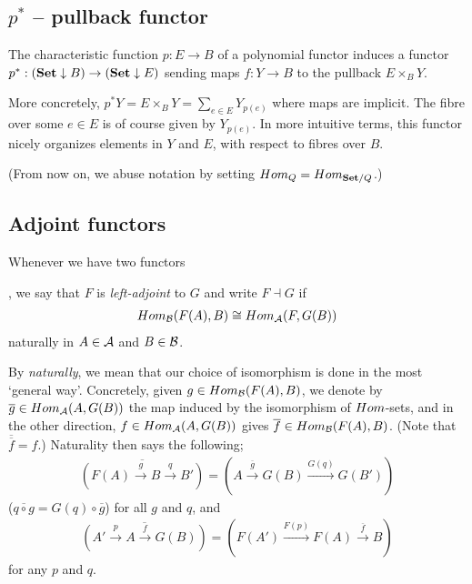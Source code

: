 \subsection{$p^*$ -- pullback functor}

The characteristic function $p:E\to B$ of a polynomial functor induces a functor $p^*:(\mathbf{Set}\downarrow B)\to(\mathbf{Set}\downarrow E)$ sending maps $f:Y\to B$ to the pullback $E\times_B Y$.

More concretely, $p^* Y = E\times_B Y = \sum_{e\in E} Y_{p(e)}$ where maps are implicit. The fibre over some $e\in E$ is of course given by $Y_{p(e)}$. In more intuitive terms, this functor nicely organizes elements in $Y$ and $E$, with respect to fibres over $B$.

(From now on, we abuse notation by setting $Hom_Q = Hom_{\mathbf{Set}/Q}$.)


\subsection{Adjoint functors}

\begin{definition}
	Whenever we have two functors
	,
	we say that $F$ is \emph{left-adjoint} to $G$ and write $F \dashv G$ if
	\begin{align*}
		Hom_{\mathcal{B}}(F(A),B) \cong Hom_{\mathcal{A}}(F,G(B))
	\end{align*}
	naturally in $A\in\mathcal{A}$ and $B\in\mathcal{B}$.
\end{definition}

By \emph{naturally}, we mean that our choice of isomorphism is done in the most `general way'. Concretely, given $g\in Hom_{\mathcal{B}}(F(A),B)$, we denote by $\overline{g}\in Hom_{\mathcal{A}}(A,G(B))$ the map induced by the isomorphism of $Hom$-sets, and in the other direction, $f\in Hom_{\mathcal{A}}(A,G(B))$ gives $\overline{f}\in Hom_{\mathcal{B}}(F(A),B)$. (Note that $\overline{\overline{f}}=f$.) Naturality then says the following;
\begin{align*}
	\overline{\left(F(A) \overset{g}{\longrightarrow} B \overset{q}{\longrightarrow} B'\right)} = \left( A \overset{\overline{g}}{\longrightarrow} G(B) \overset{G(q)}{\longrightarrow} G(B') \right)
\end{align*} ($\overline{q\circ g} = G(q)\circ\overline{g}$) for all $g$ and $q$, and
\begin{align*}
	\overline{\left( A' \overset{p}{\longrightarrow} A \overset{f}{\longrightarrow} G(B) \right)} = \left( F(A') \overset{F(p)}{\longrightarrow} F(A) \overset{\overline{f}}{\longrightarrow} B \right)
\end{align*}
for any $p$ and $q$.


